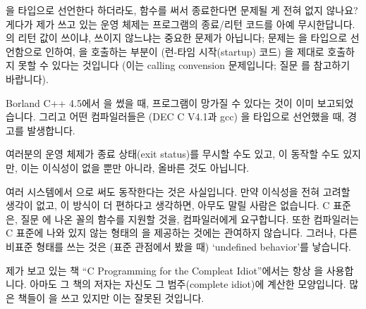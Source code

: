 \begin{faq}
	을  타입으로 선언한다 하더라도, 
	함수를 써서 종료한다면 문제될 게 전혀 없지 않나요?
	게다가 제가 쓰고 있는 운영 체제는 프로그램의 종료/리턴 코드를
	아예 무시한답니다.
\A
	의 리턴 값이 쓰이냐, 쓰이지 않느냐는 중요한 문제가
	아닙니다; 문제는 을  타입으로 선언함으로
	인하여, 을 호출하는 부분이 (런-타임 시작(startup) 코드)
	을 제대로 호출하지 못할 수 있다는 것입니다
	(이는 calling convension 문제입니다; 질문 를 참고하기
	바랍니다).

	Borland C++ 4.5에서 을 썼을 때, 프로그램이
	망가질 수 있다는 것이 이미 보고되었습니다.
	그리고 어떤 컴파일러들은 (DEC C V4.1과 gcc) 을 
	타입으로 선언했을 때, 경고를 발생합니다.

	여러분의 운영 체제가 종료 상태(exit status)를 무시할 수도 있고,
	이 동작할 수도 있지만, 이는 이식성이 없을 뿐만
	아니라, 올바른 것도 아닙니다.

        여러 시스템에서 으로 써도 동작한다는 것은 사실입니다.
        만약 이식성을 전혀 고려할 생각이 없고, 이 방식이 더 편하다고 생각하면, 
        아무도 말릴 사람은 없습니다.
\T
	C 표준은, 질문 에 나온 꼴의  함수를 지원할 것을,
        컴파일러에게 요구합니다. 또한 컴파일러는 C 표준에 나와 있지 않는 형태의
        을 제공하는 것에는 관여하지 않습니다. 그러나, 다른 비표준
        형태를 쓰는 것은 (표준 관점에서 봤을 때) `undefined behavior'를 
        낳습니다.
\end{faq}

\begin{faq}
	제가 보고 있는 책 ``C Programming for the Compleat Idiot''에서는
	항상 을 사용합니다.
\A
	아마도 그 책의 저자는 자신도 그 범주(complete idiot)에
        계산한 모양입니다.
	많은 책들이 을 쓰고 있지만 이는 잘못된 것입니다.
\end{faq}

